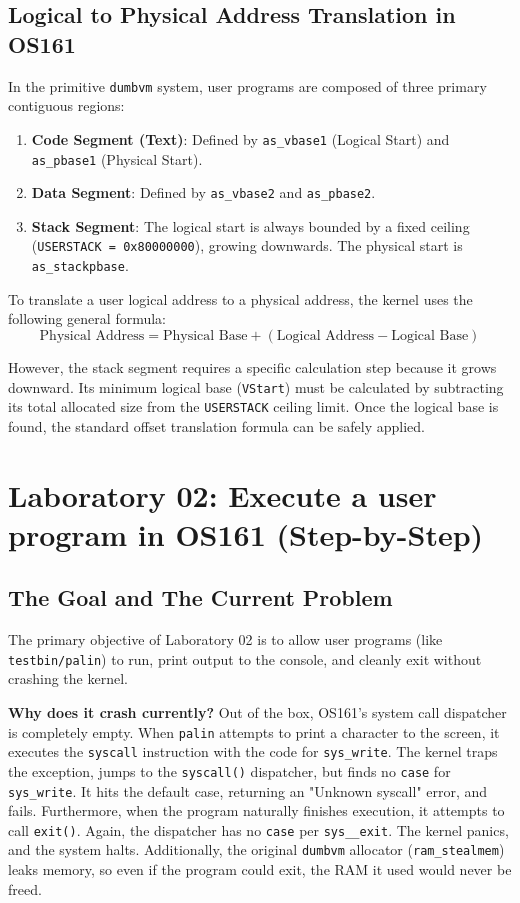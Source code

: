 \subsection{Logical to Physical Address Translation in OS161}
In the primitive \texttt{dumbvm} system, user programs are composed of three primary contiguous regions:
\begin{enumerate}
    \item \textbf{Code Segment (Text)}: Defined by \texttt{as\_vbase1} (Logical Start) and \texttt{as\_pbase1} (Physical Start).
    \item \textbf{Data Segment}: Defined by \texttt{as\_vbase2} and \texttt{as\_pbase2}.
    \item \textbf{Stack Segment}: The logical start is always bounded by a fixed ceiling (\texttt{USERSTACK = 0x80000000}), growing downwards. The physical start is \texttt{as\_stackpbase}.
\end{enumerate}

To translate a user logical address to a physical address, the kernel uses the following general formula:
\[ \text{Physical Address} = \text{Physical Base} + (\text{Logical Address} - \text{Logical Base}) \]

However, the stack segment requires a specific calculation step because it grows downward. Its minimum logical base (\texttt{VStart}) must be calculated by subtracting its total allocated size from the \texttt{USERSTACK} ceiling limit. Once the logical base is found, the standard offset translation formula can be safely applied.

\newpage

\section{Laboratory 02: Execute a user program in OS161 (Step-by-Step)}
\subsection{The Goal and The Current Problem}
The primary objective of Laboratory 02 is to allow user programs (like \texttt{testbin/palin}) to run, print output to the console, and cleanly exit without crashing the kernel. 

\textbf{Why does it crash currently?} 
Out of the box, OS161's system call dispatcher is completely empty. When \texttt{palin} attempts to print a character to the screen, it executes the \texttt{syscall} instruction with the code for \texttt{sys\_write}. The kernel traps the exception, jumps to the \texttt{syscall()} dispatcher, but finds no \texttt{case} for \texttt{sys\_write}. It hits the default case, returning an "Unknown syscall" error, and fails.
Furthermore, when the program naturally finishes execution, it attempts to call \texttt{exit()}. Again, the dispatcher has no \texttt{case} per \texttt{sys\_\_exit}. The kernel panics, and the system halts. Additionally, the original \texttt{dumbvm} allocator (\texttt{ram\_stealmem}) leaks memory, so even if the program could exit, the RAM it used would never be freed.

